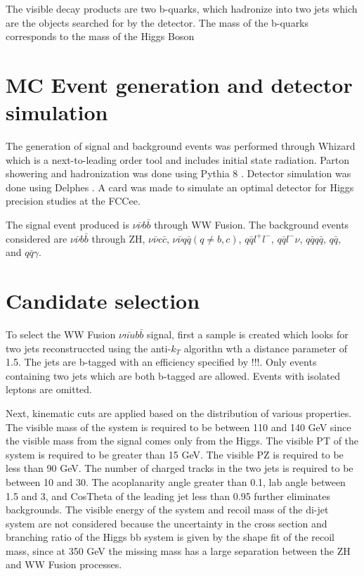 \documentclass[preprintnumbers,nofootinbib,noshowpacs,eqsecnum,prd,superscriptaddress,letterpaper]{revtex4}
\begin{document}

The visible decay products are two b-quarks, which hadronize into two jets which are the objects searched for by the detector. The mass of the b-quarks corresponds to the mass of the Higgs Boson



\section{MC Event generation and detector simulation}
\label{sec:samples}

The generation of signal and background events was performed through Whizard \cite{whizard} which is a next-to-leading order tool and includes initial state radiation. Parton showering and hadronization was done using Pythia 8 \cite{pythia}. Detector simulation was done using Delphes \cite{delphes}. A card was made to simulate an optimal detector for Higgs precision studies at the FCCee. 

The signal event produced is $\nu\bar{\nu}b\bar{b}$ through WW Fusion. The background events considered are $\nu\bar{\nu}b\bar{b}$ through ZH, $\nu\bar{\nu}c\bar{c}$, $\nu\bar{\nu}q\bar{q} (q\neq b,c)$, $q\bar{q}l^+l^-$, $q\bar{q}l^-\nu$, $q\bar{q}q\bar{q}$, $q\bar{q}$, and $q\bar{q}\gamma$.  

\section{Candidate selection}
\label{sec:selection}

To select the WW Fusion $\nu\bar{nu}b\bar{b}$ signal, first a sample is created which looks for two jets reconstruccted using the anti-$k_T$ algorithn wth a distance parameter of 1.5. The jets are b-tagged with an efficiency specified by !!!. Only events containing two jets which are both b-tagged are allowed. Events with isolated leptons are omitted. 

Next, kinematic cuts are applied based on the distribution of various properties. The visible mass of the system is required to be between 110 and 140 GeV since the visible mass from the signal comes only from the Higgs. The visible PT of the system is required to be greater than 15 GeV. The visible PZ is required to be less than 90 GeV. The number of charged tracks in the two jets is required to be between 10 and 30. The acoplanarity angle greater than 0.1, lab angle between 1.5 and 3, and CosTheta of the leading jet less than 0.95 further eliminates backgrounds. The visible energy of the system and recoil mass of the di-jet system are not considered because the uncertainty in the cross section and branching ratio of the Higgs bb system is given by the shape fit of the recoil mass, since at 350 GeV the missing mass has a large separation between the ZH and WW Fusion processes. 
\end{document}
